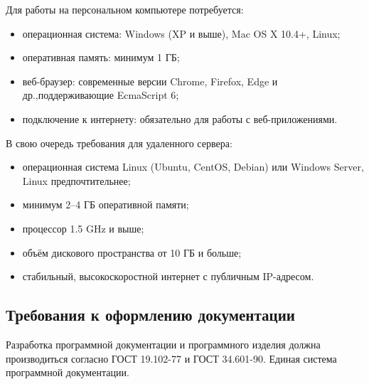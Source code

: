 Для работы на персональном компьютере потребуется:
\begin{itemize}
	\item операционная система: Windows (XP и выше), Mac OS X 10.4+, Linux;
	\item оперативная память: минимум 1 ГБ;
	\item веб-браузер: современные версии Chrome, Firefox, Edge и др.,поддерживающие EcmaScript 6;
	\item подключение к интернету: обязательно для работы с веб-приложениями.		
\end{itemize}

В свою очередь требования для удаленного сервера:
\begin{itemize}
	\item операционная система Linux (Ubuntu, CentOS, Debian) или Windows Server, Linux предпочтительнее;
	\item минимум 2–4 ГБ оперативной памяти;
	\item процессор 1.5 GHz и выше;
	\item объём дискового пространства от 10 ГБ и больше;
	\item стабильный, высокоскоростной интернет с публичным IP-адресом.		
\end{itemize}
\subsection{Требования к оформлению документации}

Разработка программной документации и программного изделия должна производиться согласно ГОСТ 19.102-77 и ГОСТ 34.601-90. Единая система программной документации.